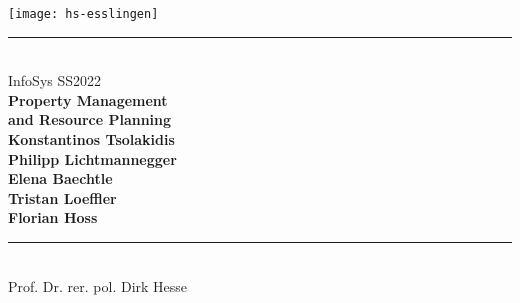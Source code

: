\newcommand{\HRule}[2]{\noindent\rule[#1]{\linewidth}{#2}}
\newcommand{\vlinespace}[1]{\vspace*{#1\baselineskip}}
\newcommand{\titleemph}[1]{\textbf{#1}}
\begin{titlepage}
    \sffamily
    \hfill
    \texttt{[image: hs-esslingen]}
    \HRule{13pt}{1pt}
    \centering
    \Large
    \vlinespace{5}\\
    InfoSys SS2022\\
    \huge
    \textbf{Property Management\\and Resource Planning}\\
    \Large
    \vlinespace{12}
    \textbf{Konstantinos Tsolakidis}\\
    \textbf{Philipp Lichtmannegger}\\
    \textbf{Elena Baechtle}\\
    \textbf{Tristan Loeffler}\\
    \textbf{Florian Hoss}\\
    \vfill
    \raggedright{}
    \HRule{13pt}{1pt} \\
    Prof. Dr. rer. pol. Dirk Hesse
\end{titlepage}